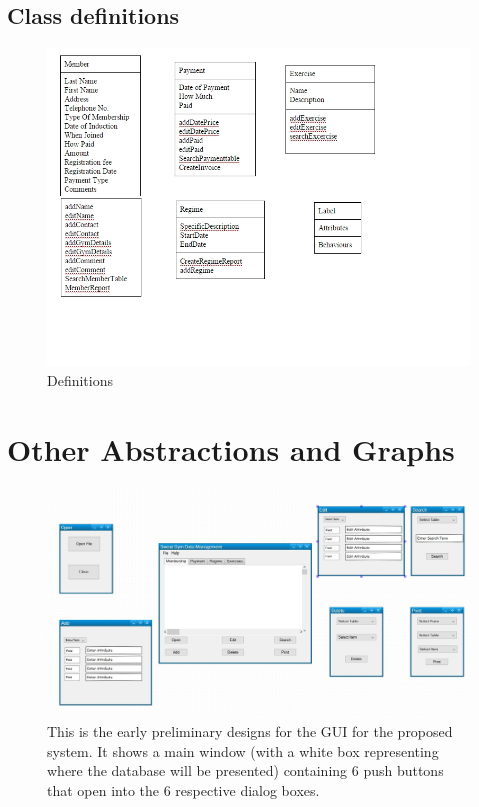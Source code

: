 \subsection{Class definitions}

\begin{figure}[H]
    \includegraphics[width=\textwidth]{ClassDefinitions.JPG}
    \caption{Definitions} \label{fig: Definitions}
\end{figure}

\section{Other Abstractions and Graphs}

\begin{figure}[H]
    \includegraphics[width=\textwidth]{GUI_DESIGNS.JPG}
    \caption{This is the early preliminary designs for the GUI for the proposed system. It shows a main window (with a white box representing where the database will be presented) containing 6 push buttons that open into the 6 respective dialog boxes.} \label{fig: Preliminary Gui Mockup Presented to Client}
\end{figure}



